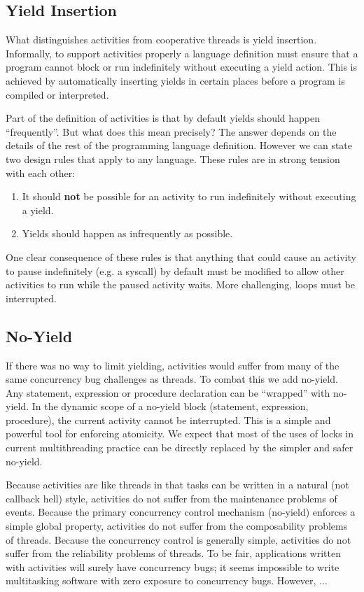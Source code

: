 \documentclass[10pt,preprint]{sigplanconf}
\begin{document}
\subsection{Yield Insertion}

What distinguishes activities from cooperative threads is yield insertion.
Informally, to support activities properly a language definition must ensure that a program cannot block or run indefinitely without executing a yield action.
This is achieved by automatically inserting yields in certain places before a program is compiled or interpreted.



Part of the definition of activities is that by default yields should happen ``frequently''.
But what does this mean precisely?
The answer depends on the details of the rest of the programming language definition.
However we can state two design rules that apply to any language.
These rules are in strong tension with each other:

\begin{enumerate}
\item It should \textbf{not} be possible for an activity to run indefinitely without executing a yield.
\item Yields should happen as infrequently as possible.
\end{enumerate}

One clear consequence of these rules is that anything that could cause an activity to pause indefinitely (e.g. a syscall) by default must be modified to allow other activities to run while the paused activity waits.
More challenging, loops must be interrupted.

\subsection{No-Yield}

If there was no way to limit yielding, activities would suffer from many of the same concurrency bug challenges as threads.
To combat this we add no-yield.
Any statement, expression or procedure declaration can be ``wrapped'' with no-yield.
In the dynamic scope of a no-yield block (statement, expression, procedure), the current activity cannot be interrupted.
This is a simple and powerful tool for enforcing atomicity.
We expect that most of the uses of locks in current multithreading practice can be directly replaced by the simpler and safer no-yield.

Because activities are like threads in that tasks can be written in a natural (not callback hell) style, activities do not suffer from the maintenance problems of events.
Because the primary concurrency control mechanism (no-yield) enforces a simple global property, activities do not suffer from the composability problems of threads.
Because the concurrency control is generally simple, activities do not suffer from the reliability problems of threads.
To be fair, applications written with activities will surely have concurrency bugs; it seems impossible to write multitasking software with zero exposure to concurrency bugs.
However, ...
\end{document}
